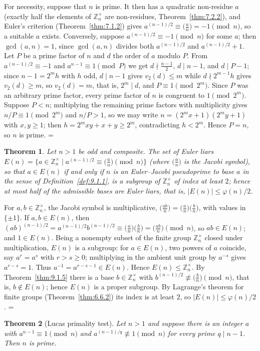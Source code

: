 \documentclass[11pt]{article}
\makeatletter
\theoremstyle{ntstyle}
\newtheorem{theorem}{Theorem}[subsection]
\let\nt@closedisplay\]
\def\nt@guardedclose{\@ifnextchar\par{\nt@closeafterpar}{\@ifnextchar\end{\postdisplaypenalty\@M\nt@closedisplay}{\nt@closedisplay}}}
\def\nt@closeafterpar\par{\@ifnextchar\par{\nt@closeafterpar}{\@ifnextchar\end{\postdisplaypenalty\@M\nt@closedisplay\par}{\nt@closedisplay\par}}}
\renewenvironment{proof}[1][\proofname]{\par
  \pushQED{\qed}\normalfont\topsep\medskipamount\edef\nt@afterproof{\@endparpenalty=\the\@endparpenalty\relax}\@beginparpenalty\@M\@endparpenalty\@M\let\]\nt@guardedclose\trivlist\item[]\textit{#1\@addpunct{.}} \ignorespaces}{\ifvmode\addpenalty\@M\fi\popQED\nt@afterproof\endtrivlist\@endpefalse}
\newcommand{\legs}[2]{\bigl(\tfrac{#1}{#2}\bigr)}
\newcommand{\ZmodUnits}[1]{\mathbb{Z}_{#1}^{\times}}
\makeatother
\begin{document}
\begin{proof} For necessity, suppose that $n$ is prime. It then has
	a quadratic non-residue $a$ (exactly half the elements of $\ZmodUnits{n}$ are non-residues, Theorem~\ref{thm:7.2.2}),
	and Euler's criterion (Theorem~\ref{thm:7.1.2}) gives $a^{(n-1)/2}\equiv\legs{a}{n}=-1\pmod{n}$,
	so a suitable $a$ exists. Conversely, suppose
	$a^{(n-1)/2}\equiv-1\pmod{n}$ for some $a$; then
	$\gcd(a, n)=1$, since $\gcd(a,n)$ divides both $a^{(n-1)/2}$ and $a^{(n-1)/2}+1$. Let $P$ be a
	prime factor of $n$ and $d$ the order of
	$a$ modulo $P$. From $a^{(n-1)/2}\equiv-1$ and $a^{n-1}\equiv1\pmod{P}$ we get
	$d\nmid\tfrac{n-1}{2}$, $d\mid n-1$, and $d\mid P-1$; since
	$n-1=2^{m}h$ with $h$ odd, $d\mid n-1$ gives $v_2(d)\le m$ while
	$d\nmid 2^{m-1}h$ gives $v_2(d)\ge m$, so $v_2(d)=m$, that is, $2^{m}\mid d$, and $P\equiv1\pmod{2^{m}}$.
	Since $P$ was an arbitrary prime factor, every prime factor of $n$ is
	congruent to $1\pmod{2^m}$. Suppose $P<n$; multiplying the remaining prime factors
	with multiplicity gives $n/P\equiv1\pmod{2^m}$ and $n/P>1$, so we may write
	$n=(2^{m}x+1)(2^{m}y+1)$ with $x,y\ge1$; then
	$h=2^{m}xy+x+y\ge2^{m}$, contradicting $h<2^{m}$. Hence $P=n$, so $n$
	is prime.
\end{proof}
\begin{theorem}\label{thm:9.1.7} Let
	$n>1$ be odd and composite. The set of Euler liars
	$E(n)=\{a\in\ZmodUnits{n} \mid a^{(n-1)/2}\equiv\legs{a}{n}\pmod{n}\}$ (where $\legs{a}{n}$ is the Jacobi
	symbol), so that $a\in E(n)$ if and only if $n$ is an Euler--Jacobi pseudoprime to base $a$ in the
	sense of Definition~\ref{def:9.1.1}, is a subgroup of $\ZmodUnits{n}$ of index at least
	$2$; hence at most half of the admissible bases are Euler liars, that is, $|E(n)|\le\varphi(n)/2$.
\end{theorem}

\begin{proof} For $a,b\in\ZmodUnits{n}$, the
	Jacobi symbol is multiplicative,
	$\legs{ab}{n}=\legs{a}{n}\legs{b}{n}$, with values in $\{\pm1\}$. If $a,b\in E(n)$, then
	$(ab)^{(n-1)/2}=a^{(n-1)/2}b^{(n-1)/2}\equiv\legs{a}{n}\legs{b}{n}=\legs{ab}{n}\pmod{n}$, so
	$ab\in E(n)$; and $1\in E(n)$. Being a nonempty subset of the finite group $\ZmodUnits{n}$ closed
	under multiplication, $E(n)$ is a subgroup: for $a\in E(n)$, two powers of $a$ coincide, say
	$a^r=a^s$ with $r>s\ge0$; multiplying in the ambient unit group by $a^{-s}$ gives $a^{r-s}=1$.
	Thus $a^{-1}=a^{r-s-1}\in E(n)$. Hence $E(n)\le\ZmodUnits{n}$. By Theorem~\ref{thm:9.1.5} there is
	a base
	$b\in\ZmodUnits{n}$ with $b^{(n-1)/2}\not\equiv\legs{b}{n}\pmod{n}$, that is, $b\notin E(n)$; hence $E(n)$ is a proper
	subgroup. By Lagrange's theorem for finite groups (Theorem~\ref{thm:6.6.2}) its index is at least $2$, so
	$|E(n)|\le\varphi(n)/2$.
\end{proof}
\begin{theorem}[Lucas primality test]\label{thm:9.1.8} Let $n>1$
	and suppose there is an integer $a$ with $a^{n-1}\equiv1\pmod{n}$ and
	$a^{(n-1)/q}\not\equiv1\pmod{n}$ for every prime $q\mid n-1$. Then $n$ is prime.
\end{theorem}
\end{document}
